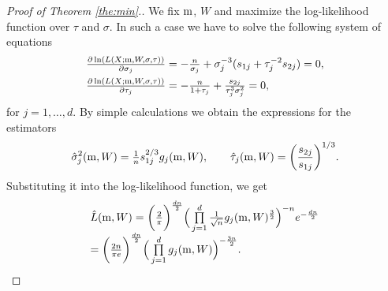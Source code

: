 \begin{proof}[Proof of Theorem \ref{the:min}.]
We fix  $\mathrm{m}$, $W$ and maximize the log-likelihood function over $\tau$ and $\sigma$.
In such a case we have to solve the following system of equations
$$
\begin{array}{l}
\frac{\partial  \ln ( L(X;\m,W,\sigma,\tau) ) }{\partial \sigma_j} = -\frac{n}{\sigma_j} +  \sigma_j^{-3} (s_{1j} + \tau_j^{-2} s_{2j} )
 =0, \\[6pt] %
 \frac{\partial  \ln ( L(X;\m,W,\sigma,\tau) ) }{\partial \tau_j} = - \frac{n}{1+\tau_j} + \frac{s_{2j}}{\tau_j^{3}\sigma_j^{2}} =0 , %
\end{array}
$$
for  $ j=1,\ldots,d$.
By simple calculations we obtain the expressions for the estimators
$$
\hat{\sigma}_j^2(\mathrm{m},W) = 
\tfrac{1}{n} s_{1j}^{2/3} g_{j}(\mathrm{m},W), \qquad
\hat{\tau}_{j}(\mathrm{m},W) = \bigg( \frac{s_{2j}}{s_{1j}} \bigg)^{1/3}.
$$
Substituting it into the log-likelihood function,
we get
$$
\begin{array}{l}
\hat{L}(\mathrm{m},W) = \bigg( \frac{2}{\pi} \bigg)^{\frac{dn}{2}} \Big( \prod\limits_{j=1}^{d} \frac{1}{\sqrt{n}} g_j(\mathrm{m},W)^{\frac{3}{2}} \Big)^{-n}  e^{-\frac{dn}{2}}\\[6pt]
= \bigg( \frac{2n}{\pi e} \bigg)^{\frac{dn}{2}}  \Big( \prod\limits_{j=1}^{d} g_j(\mathrm{m},W) \Big)^{-\frac{3n}{2}}. 
\end{array}
$$
\end{proof}



